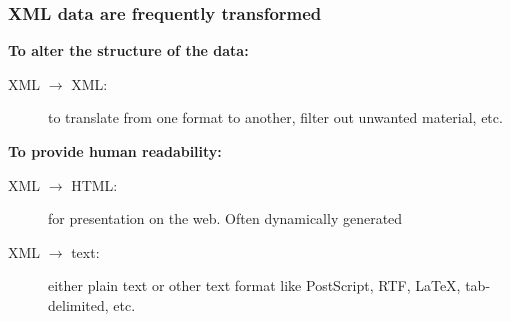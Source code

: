 \frame
{
	\frametitle{XML data are frequently transformed}
	
	\textbf{To alter the structure of the data:}

	\begin{description}
	
		\item[XML \(\rightarrow\) XML:] to translate from one format to
		another, filter out unwanted material, etc.
		
	\end{description}

	\textbf{To provide human readability:}
	
	\begin{description}
	
		\item[XML \(\rightarrow\) HTML:] for presentation on the web.
		Often dynamically generated
		
		\item[XML \(\rightarrow\) text:] either plain text or other text
		format like PostScript, RTF, \LaTeX, tab-delimited, etc.
	
	\end{description}
	
}





